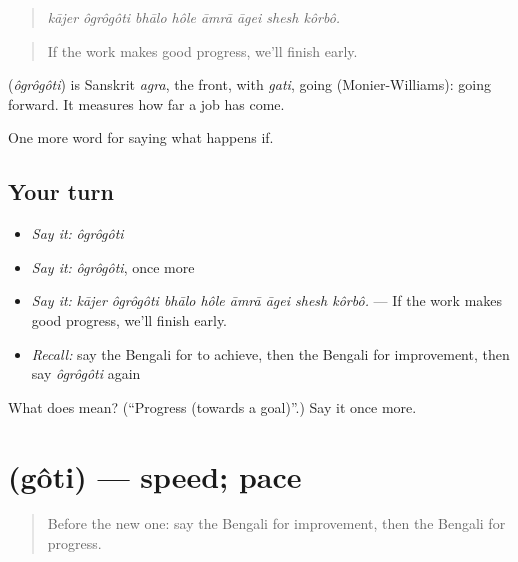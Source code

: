 \begin{quote}
\emph{kājer ôgrôgôti bhālo hôle āmrā āgei shesh kôrbô.}
\end{quote}

\begin{quote}
If the work makes good progress, we'll finish early.
\end{quote}

\begin{cousinweb}
\textbf{} (\emph{ôgrôgôti}) is Sanskrit \emph{agra}, the front, with \emph{gati}, going (Monier-Williams): going forward. It measures how far a job has come.
\end{cousinweb}

\begin{grammarlens}[title={What you've built}]
One more word for saying what happens if.
\end{grammarlens}

\subsection*{Your turn}
\begin{itemize}
\raggedright
  \item \emph{Say it:} \emph{ôgrôgôti}
  \item \emph{Say it:} \emph{ôgrôgôti}, once more
  \item \emph{Say it:} \emph{kājer ôgrôgôti bhālo hôle āmrā āgei shesh kôrbô.} — If the work makes good progress, we'll finish early.
  \item \emph{Recall:} say the Bengali for to achieve, then the Bengali for improvement, then say \emph{ôgrôgôti} again
\end{itemize}

\begin{tcolorbox}[breakable,colback=teal!4,colframe=teal!35!black,title={Before you move on}]
What does  mean? (\textquotedblleft{}Progress (towards a goal)\textquotedblright{}.) Say it once more.
\end{tcolorbox}
\section[\texorpdfstring{\bn{গতি} (gôti)}{গতি (gôti)}]{ (gôti) — speed; pace}

\label{lesson:BN-C377-goti}



\begin{quote}
Before the new one: say the Bengali for improvement, then the Bengali for progress.
\end{quote}

